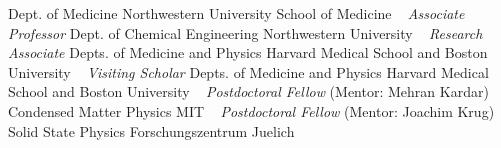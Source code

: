     Dept. of Medicine
\newline
Northwestern University School of Medicine
\newline
~
\Gap
{}
\textit{Associate Professor} 
    \newline
    Dept. of Chemical Engineering
\newline
Northwestern University
\newline
~
\Gap
{}
\textit{Research Associate} 
    \newline
    Depts. of Medicine and Physics
\newline
Harvard Medical School and Boston University
\newline
~
\Gap
{}
\textit{Visiting Scholar} 
    \newline
    Depts. of Medicine and Physics
\newline
Harvard Medical School and Boston University
\newline
~
\Gap
{}
\textit{Postdoctoral Fellow} (Mentor: Mehran Kardar)
    \newline
    Condensed Matter Physics
\newline
MIT
\newline
~
\Gap
{}
\textit{Postdoctoral Fellow} (Mentor: Joachim Krug)
    \newline
    Solid State Physics
\newline
Forschungszentrum Juelich
\newline
~
\Gap
\vspace*{0.2cm}